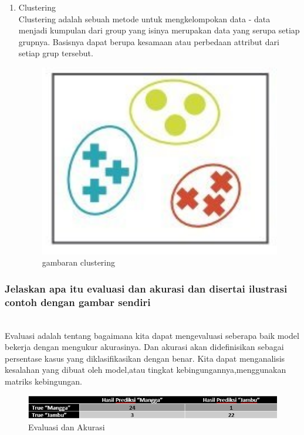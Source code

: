\begin{enumerate}
\item Clustering 
\hfill\\
Clustering adalah sebuah metode untuk mengkelompokan data - data menjadi kumpulan dari group yang isinya merupakan data yang serupa setiap grupnya. Basisnya dapat berupa kesamaan atau perbedaan attribut dari setiap grup tersebut.
\begin{figure}[H]
    \includegraphics[width=12cm]{figures/1174077/2/cl.png}
    \centering
    \caption{gambaran clustering}
\end{figure}
\end{enumerate}

\subsubsection{Jelaskan apa itu evaluasi dan akurasi dan disertai ilustrasi contoh dengan gambar sendiri}
\hfill\\
Evaluasi adalah tentang bagaimana kita dapat mengevaluasi seberapa baik model bekerja dengan mengukur akurasinya. Dan akurasi akan dideﬁnisikan sebagai persentase kasus yang diklasiﬁkasikan dengan benar. Kita dapat menganalisis kesalahan yang dibuat oleh model,atau tingkat kebingungannya,menggunakan matriks kebingungan. 
\begin{figure}[H]
    \includegraphics[width=12cm]{figures/1174077/2/ea.png}
    \centering
    \caption{Evaluasi dan Akurasi}
\end{figure}

